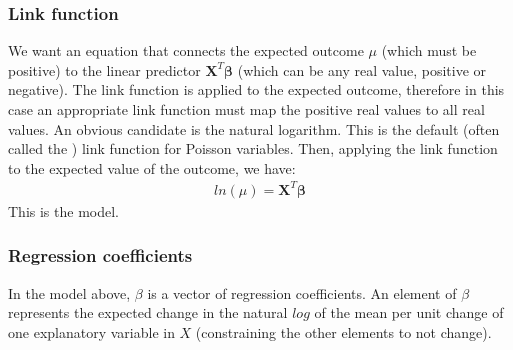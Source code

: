 \documentclass[letterpaper,10pt,english]{jupyterBook}
\begin{document}
\subsubsection{Link function}
\label{\detokenize{16.g. Generalised Linear Model (GLM):link-function}}
\sphinxAtStartPar
We want an equation that connects the expected outcome \(\mu\) (which must be positive) to the linear predictor \(\mathbf{X}^T\mathbf{\beta}\)  (which can be any real value, positive or negative). The link function is applied to the expected outcome, therefore in this case an appropriate link function must map the positive real values to all real values. An obvious candidate is the natural logarithm. This is the default (often called the ) link function for Poisson variables. Then, applying the link function to the expected value of the outcome, we have:
\begin{equation*}
\begin{split}
ln(\mu) = \mathbf{X}^T\mathbf{\beta}
\end{split}
\end{equation*}
\sphinxAtStartPar
This is the  model.


\subsubsection{Regression coefficients}
\label{\detokenize{16.g. Generalised Linear Model (GLM):regression-coefficients}}
\sphinxAtStartPar
In the model above, \(\beta\) is a vector of regression coefficients. An element of \(\beta\) represents the expected change in the natural \(log\) of the mean per unit change of one explanatory variable in \(X\) (constraining the other elements to not change).
\end{document}
